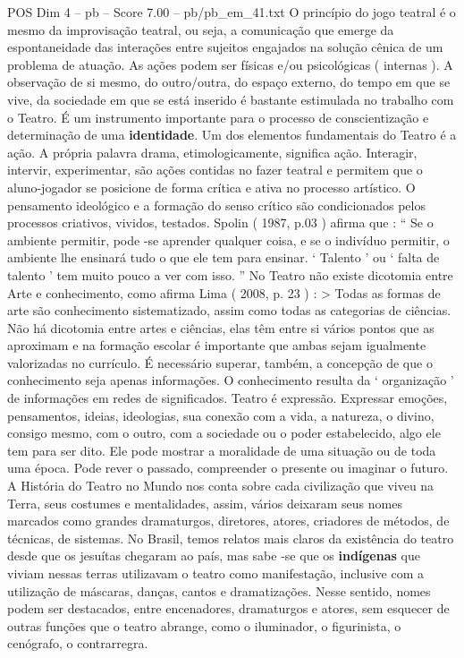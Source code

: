 \begin{textsample}{POS Dim 4 – pb – Score 7.00 – pb/pb\_em\_41.txt}
O princípio do jogo teatral é o mesmo da improvisação teatral, ou seja, a comunicação que emerge da espontaneidade das interações entre sujeitos engajados na solução cênica de um problema de atuação.
As ações podem ser físicas e/ou psicológicas ( internas ).
A observação de si mesmo, do outro/outra, do espaço externo, do tempo em que se vive, da sociedade em que se está inserido é bastante estimulada no trabalho com o Teatro.
É um instrumento importante para o processo de conscientização e determinação de uma \textbf{identidade}.
Um dos elementos fundamentais do Teatro é a ação.
A própria palavra drama, etimologicamente, significa ação.
Interagir, intervir, experimentar, são ações contidas no fazer teatral e permitem que o aluno-jogador se posicione de forma crítica e ativa no processo artístico.
O pensamento ideológico e a formação do senso crítico são condicionados pelos processos criativos, vividos, testados.
Spolin ( 1987, p.03 ) afirma que : “ Se o ambiente permitir, pode -se aprender qualquer coisa, e se o indivíduo permitir, o ambiente lhe ensinará tudo o que ele tem para ensinar. ‘ Talento ’ ou ‘ falta de talento ’ tem muito pouco a ver com isso. ” No Teatro não existe dicotomia entre Arte e conhecimento, como afirma Lima ( 2008, p. 23 ) : > Todas as formas de arte são conhecimento sistematizado, assim como todas as categorias de ciências.
Não há dicotomia entre artes e ciências, elas têm entre si vários pontos que as aproximam e na formação escolar é importante que ambas sejam igualmente valorizadas no currículo.
É necessário superar, também, a concepção de que o conhecimento seja apenas informações.
O conhecimento resulta da ‘ organização ’ de informações em redes de significados.
Teatro é expressão.
Expressar emoções, pensamentos, ideias, ideologias, sua conexão com a vida, a natureza, o divino, consigo mesmo, com o outro, com a sociedade ou o poder estabelecido, algo ele tem para ser dito.
Ele pode mostrar a moralidade de uma situação ou de toda uma época.
Pode rever o passado, compreender o presente ou imaginar o futuro.
A História do Teatro no Mundo nos conta sobre cada civilização que viveu na Terra, seus costumes e mentalidades, assim, vários deixaram seus nomes marcados como grandes dramaturgos, diretores, atores, criadores de métodos, de técnicas, de sistemas.
No Brasil, temos relatos mais claros da existência do teatro desde que os jesuítas chegaram ao país, mas sabe -se que os \textbf{indígenas} que viviam nessas terras utilizavam o teatro como manifestação, inclusive com a utilização de máscaras, danças, cantos e dramatizações.
Nesse sentido, nomes podem ser destacados, entre encenadores, dramaturgos e atores, sem esquecer de outras funções que o teatro abrange, como o iluminador, o figurinista, o cenógrafo, o contrarregra.

\end{textsample}
